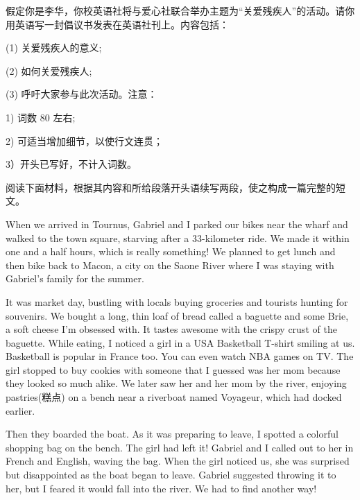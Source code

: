 \documentclass{英语试卷}
\begin{document}
\par 假定你是李华，你校英语社将与爱心社联合举办主题为“关爱残疾人”的活动。请你用英语写一封倡议书发表在英语社刊上。内容包括：\par
\par (1) 关爱残疾人的意义;\par
\par (2) 如何关爱残疾人;\par
\par (3) 呼吁大家参与此次活动。注意：\par
\par 1) 词数 80 左右;\par
\par 2) 可适当增加细节，以使行文连贯；\par
\par 3）开头已写好，不计入词数。\par
{}
\par 阅读下面材料，根据其内容和所给段落开头语续写两段，使之构成一篇完整的短文。\par
\par When we arrived in Tournus, Gabriel and I parked our bikes near the wharf and walked to the town square, starving after a 33-kilometer ride. We made it within one and a half hours, which is really something! We planned to get lunch and then bike back to Macon, a city on the Saone River where I was staying with Gabriel's family for the summer.\par
\par It was market day, bustling with locals buying groceries and tourists hunting for souvenirs. We bought a long, thin loaf of bread called a baguette and some Brie, a soft cheese I'm obsessed with. It tastes awesome with the crispy crust of the baguette. While eating, I noticed a girl in a USA Basketball T-shirt smiling at us. Basketball is popular in France too. You can even watch NBA games on TV. The girl stopped to buy cookies with someone that I guessed was her mom because they looked so much alike. We later saw her and her mom by the river, enjoying pastries(糕点) on a bench near a riverboat named Voyageur, which had docked earlier.\par
\par Then they boarded the boat. As it was preparing to leave, I spotted a colorful shopping bag on the bench. The girl had left it! Gabriel and I called out to her in French and English, waving the bag. When the girl noticed us, she was surprised but disappointed as the boat began to leave. Gabriel suggested throwing it to her, but I feared it would fall into the river. We had to find another way!\par
\end{document}
